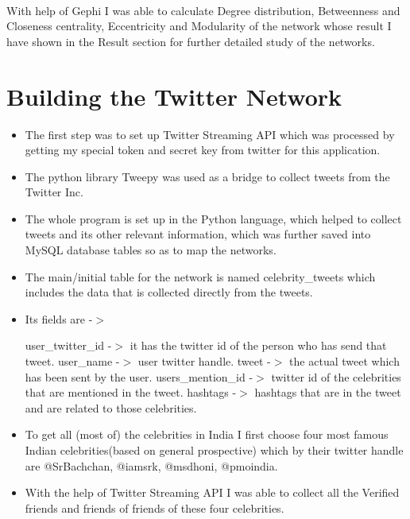 \documentclass[runningheads,a4paper]{llncs}
\begin{document}
\paragraph{}
With help of Gephi I was able to calculate Degree distribution, Betweenness and Closeness centrality, Eccentricity and Modularity of the network whose result I have shown in the Result section for further detailed study of the networks.

\section{Building the Twitter Network}

\begin{itemize}

\item The first step was to set up Twitter Streaming API which was processed by getting my special token and secret key from twitter for this application.

\item The python library Tweepy was used as a bridge to collect tweets from the Twitter Inc.

\item The whole program is set up in the Python language, which helped to collect tweets and its other relevant information, which was further saved into MySQL database tables so as to map the networks.

\item The main/initial table for the network is named celebrity\_tweets which includes the data that is collected directly from the tweets.

\item Its fields are -$>$

\subitem	user\_twitter\_id  -$>$  it has the twitter id of the person who has send that tweet.
\subitem	user\_name  -$>$  user twitter handle.
\subitem	tweet  -$>$  the actual tweet which has been sent by the user.
\subitem	users\_mention\_id  -$>$  twitter id of the celebrities that are mentioned in the tweet.
\subitem	hashtags -$>$ hashtags that are in the tweet and are related to those celebrities. 

\item	To get all (most of) the celebrities in India I first choose four most famous Indian celebrities(based on general prospective) which by their twitter handle are @SrBachchan, @iamsrk, @msdhoni, @pmoindia.

\item	With the help of Twitter Streaming API I was able to collect all the Verified friends and friends of friends of these four celebrities.


\end{itemize}
\end{document}
